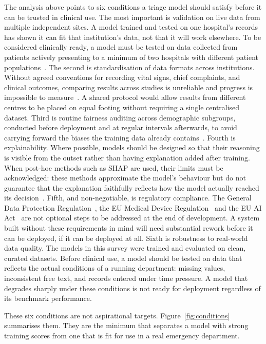 \documentclass[11pt]{article}
\begin{document}
The analysis above points to six conditions a triage model should satisfy before it can be trusted in clinical use. The most important is validation on live data from multiple independent sites. A model trained and tested on one hospital's records has shown it can fit that institution's data, not that it will work elsewhere. To be considered clinically ready, a model must be tested on data collected from patients actively presenting to a minimum of two hospitals with different patient populations~\cite{Sanchez2022, Fernandes}. The second is standardisation of data formats across institutions. Without agreed conventions for recording vital signs, chief complaints, and clinical outcomes, comparing results across studies is unreliable and progress is impossible to measure~\cite{Vantu2023, Wang2023}. A shared protocol would allow results from different centres to be placed on equal footing without requiring a single centralised dataset. Third is routine fairness auditing across demographic subgroups, conducted before deployment and at regular intervals afterwards, to avoid carrying forward the biases the training data already contains~\cite{SeyyedKalantari2021}. Fourth is explainability. Where possible, models should be designed so that their reasoning is visible from the outset rather than having explanation added after training. When post-hoc methods such as SHAP are used, their limits must be acknowledged: these methods approximate the model's behaviour but do not guarantee that the explanation faithfully reflects how the model actually reached its decision~\cite{Antoniadi}. Fifth, and non-negotiable, is regulatory compliance. The General Data Protection Regulation~\cite{GDPR}, the EU Medical Device Regulation~\cite{MDR} and the EU AI Act~\cite{AIAct} are not optional steps to be addressed at the end of development. A system built without these requirements in mind will need substantial rework before it can be deployed, if it can be deployed at all. Sixth is robustness to real-world data quality. The models in this survey were trained and evaluated on clean, curated datasets. Before clinical use, a model should be tested on data that reflects the actual conditions of a running department: missing values, inconsistent free text, and records entered under time pressure. A model that degrades sharply under these conditions is not ready for deployment regardless of its benchmark performance.

These six conditions are not aspirational targets. Figure~\ref{fig:conditions} summarises them. They are the minimum that separates a model with strong training scores from one that is fit for use in a real emergency department.
\end{document}
